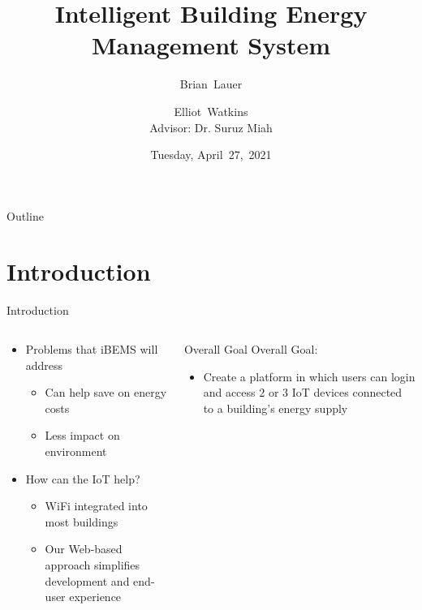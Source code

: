 \documentclass{beamer}
\title[iBEMS]{Intelligent Building Energy Management System}
\author[B.~Lauer, E.~Watkins]{Brian~Lauer \and Elliot~Watkins\\
Advisor: Dr. Suruz Miah}
\institute[Bradley University] %
{
  Department of Electrical and Computer Engineering\\
  Bradley University\\
  1501 W. Bradley Avenue\\
  Peoria, IL, 61625, USA
}
\date[April~27,~2021]{Tuesday, April~27,~2021}
\begin{document}
\begin{frame}
  \titlepage
\end{frame}

\begin{frame}{Outline} %
  \tableofcontents%
\end{frame}

\section{Introduction}

\begin{frame}{Introduction}{} %
  \begin{columns}
    \begin{block}{}
      \begin{small}
        \begin{itemize}
        \item Problems that iBEMS will address
          \begin{itemize}
          \item Can help save on energy costs
          \item Less impact on environment
          \end{itemize}
        \item How can the IoT help?
          \begin{itemize}
          \item WiFi integrated into most buildings
          \item Our Web-based approach simplifies development and end-user experience
          \end{itemize}
        \end{itemize}
      \end{small}
    \end{block}
    {\small
      \begin{block}{Overall Goal}
        Overall Goal:
        \begin{itemize}
        \item Create a platform in which users can login and access $2$ or $3$ IoT devices connected to a building's energy supply

\end{itemize}
\end{block}}
\end{columns}
\end{frame}
\end{document}
